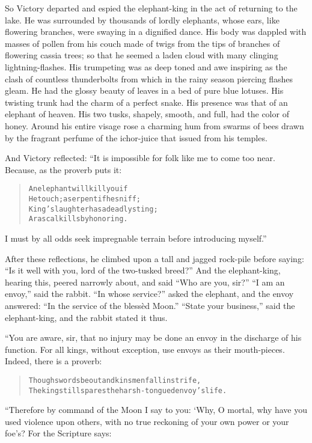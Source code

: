 \documentclass[article, twoside, 14pt]{memoir}
\renewenvironment{verbatim}{%
\begin{quote}%
\vskip -10pt%
\begin{alltt}\normalfont\large}{\end{alltt}%
\end{quote}%
\vskip -10pt
} %
\begin{document}
So Victory departed and espied the elephant-king in the act of
returning to the lake. He was surrounded by thousands of lordly
elephants, whose ears, like flowering branches, were swaying in a
dignified dance. His body was dappled with masses of pollen from
his couch made of twigs from the tips of branches of flowering
cassia trees; so that he seemed a laden cloud with many clinging
lightning-flashes. His trumpeting was as deep toned and awe
inspiring as the clash of countless thunderbolts from which in the
rainy season piercing flashes gleam. He had the glossy beauty of
leaves in a bed of pure blue lotuses. His twisting trunk had the
charm of a perfect snake. His presence was that of an elephant of
heaven. His two tusks, shapely, smooth, and full, had the color of
honey. Around his entire visage rose a charming hum from swarms of
bees drawn by the fragrant perfume of the ichor-juice that issued
from his temples.

And Victory reflected: “It is impossible for folk like me to come
too near. Because, as the proverb puts it:

\begin{verbatim}
An elephant will kill you if
He touch; a serpent if he sniff;
King's laughter has a deadly sting;
A rascal kills by honoring.
\end{verbatim}
I must by all odds seek impregnable terrain before introducing
myself.”

After these reflections, he climbed upon a tall and jagged
rock-pile before saying:
``Is it well with you, lord of the two-tusked breed?'' And the
elephant-king, hearing this, peered narrowly about, and said
``Who are you, sir?'' ``I am an envoy,'' said the rabbit.
``In whose service?'' asked the elephant, and the envoy answered:
``In the service of the blessèd Moon.'' ``State your business,''
said the elephant-king, and the rabbit stated it thus.

“You are aware, sir, that no injury may be done an envoy in the
discharge of his function. For all kings, without exception, use
envoys as their mouth-pieces. Indeed, there is a proverb:

\begin{verbatim}
Though swords be out and kinsmen fall in strife,
The king still spares the harsh-tongued envoy's life.
\end{verbatim}
“Therefore by command of the Moon I say to you: ‘Why, O mortal, why
have you used violence upon others, with no true reckoning of your
own power or your foe's? For the Scripture says:
\end{document}
